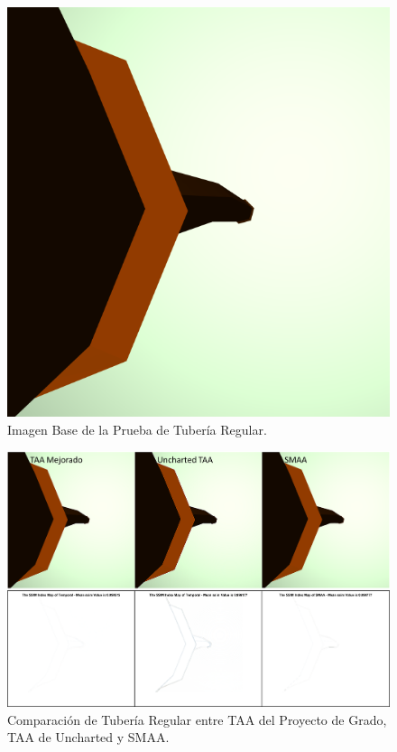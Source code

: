 \documentclass[pregrado]{tesis-usb} %
\begin{document}
\begin{figure}[!htb]
	\centering
	\includegraphics[scale=0.2]{images/results/pipe_regular_sobel_ground_truth.png}
	\caption{Imagen Base de la Prueba de Tubería Regular.}\label{fig:pipe_regular_truth}
\end{figure}


\begin{figure}[!htb]
	\centering
	\includegraphics[scale=0.5]{images/results/pipe_regular.png}
	\caption{Comparación de Tubería Regular entre TAA del Proyecto de Grado, TAA de Uncharted y SMAA.}\label{fig:pipe_regular_render}
\end{figure}
\end{document}

